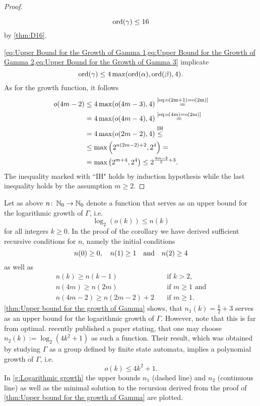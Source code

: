 \begin{proof}
\begin{clist}
\begin{equation}
\operatorname{\mathrm{ord}}(\gamma)\leq 16
\end{equation}
by \cref{thm:D16}.
\end{clist}
\cref{eq:Upper Bound for the Growth of Gamma 1,eq:Upper Bound for the Growth of Gamma 2,eq:Upper Bound for the Growth of Gamma 3} implicate
\begin{equation*}
\operatorname{\mathrm{ord}}(\gamma)\leq4\max(\operatorname{\mathrm{ord}}(\alpha), \operatorname{\mathrm{ord}}(\beta), 4).
\end{equation*}
As for the growth function, it follows
\begin{align*}
o(4m-2)	&\leq 4\max(o(4m-3),4)\overset{\text{\cref{eq:o(2m+1)=o(2m)}}}{=}\\
		&= 4\max(o(4m-4),4)\overset{\text{\cref{eq:o(4m)=o(2m)}}}{=}\\
		&=4\max(o(2m-2),4)\overset{\text{IH}}{\leq}\\
		&\leq \max\left(2^{n(2m-2)+2}, 2^4\right)=\\
		&=\max\left(2^{m+4},2^4\right)\leq 2^{\frac{4m-2}{2}+3}.
\end{align*}
The inequality marked with ``IH" holds by induction hypothesis while the last inequality holds by the assumption $m\geq 2$.
\end{proof}

Let as above $n\colon\operatorname{\mathbb{N}}_0\to\operatorname{\mathbb{N}}_0$ denote a function that serves as an upper bound for the logarithmic growth of $\Gamma$, i.e.
\begin{equation*}
\log_2(o(k))\leq n(k)
\end{equation*}
for all integers $k\geq 0$. In the proof of the corollary we have derived sufficient recursive conditions for $n$, namely the initial conditions
\begin{equation*}
n(0)\geq 0,\quad n(1)\geq 1\quad \text{and}\quad n(2)\geq 4\\
\end{equation*}
as well as
\begin{align*}
n(k)\geq n(k-1)&\quad\text{if } k>2,\\
n(4m)\geq n(2m)&\quad\text{if } m\geq 1\text{ and}\\
n(4m-2)\geq n(2m-2)+2&\quad\text{if } m\geq 1.
\end{align*}
\cref{thm:Upper bound for the growth of Gamma} shows, that $n_1(k)=\frac{k}{2}+3$ serves as an upper bound for the logarithmic growth of $\Gamma$. However, note that this is far from optimal. \textcite{2006math} recently published a paper stating, that one may choose $n_2(k):=\log_2(4k^2+1)$ as such a function. Their result, which was obtained by studying $\Gamma$ as a group defined by finite state automata, implies a polynomial growth of $\Gamma$, i.e.
\begin{equation*}
o(k)\leq 4k^2+1.
\end{equation*}
In \cref{g:Logarithmic growth} the upper bounds $n_1$ (dashed line) and $n_2$ (continuous line) as well as the minimal solution to the recursion derived from the proof of \cref{thm:Upper bound for the growth of Gamma} are plotted. 

